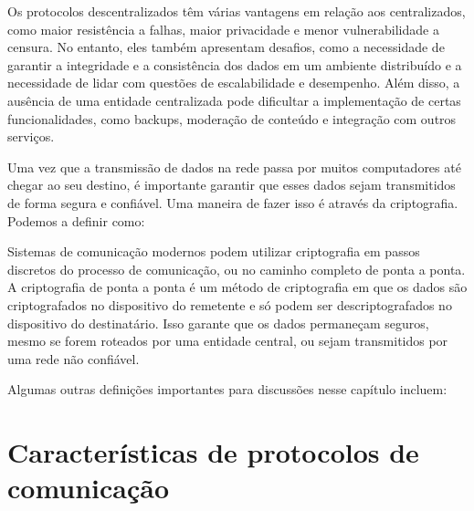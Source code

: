 
Os protocolos descentralizados têm várias vantagens em relação aos centralizados, como maior resistência a falhas, maior privacidade e menor vulnerabilidade a censura. No entanto, eles também apresentam desafios, como a necessidade de garantir a integridade e a consistência dos dados em um ambiente distribuído e a necessidade de lidar com questões de escalabilidade e desempenho. Além disso, a ausência de uma entidade centralizada pode dificultar a implementação de certas funcionalidades, como backups, moderação de conteúdo e integração com outros serviços.

Uma vez que a transmissão de dados na rede passa por muitos computadores até chegar ao seu destino, é importante garantir que esses dados sejam transmitidos de forma segura e confiável. Uma maneira de fazer isso é através da criptografia. Podemos a definir como:


Sistemas de comunicação modernos podem utilizar criptografia em passos discretos do processo de comunicação, ou no caminho completo de ponta a ponta. A criptografia de ponta a ponta é um método de criptografia em que os dados são criptografados no dispositivo do remetente e só podem ser descriptografados no dispositivo do destinatário. Isso garante que os dados permaneçam seguros, mesmo se forem roteados por uma entidade central, ou sejam transmitidos por uma rede não confiável.

Algumas outras definições importantes para discussões nesse capítulo incluem:

\section{Características de protocolos de comunicação}

